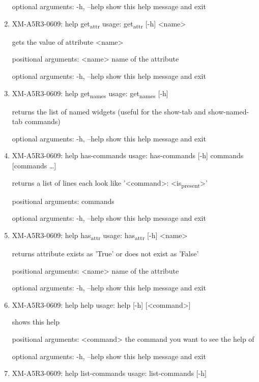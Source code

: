 \documentclass[11pt]{article}
\begin{document}
\begin{enumerate}
optional arguments:
  -h, --help  show this help message and exit

\item XM-A5R3-0609: help get\textsubscript{attr}
\label{sec:orgcdb95ce}
usage: get\textsubscript{attr} [-h] <name>

gets the value of attribute <name>

positional arguments:
  <name>      name of the attribute

optional arguments:
  -h, --help  show this help message and exit

\item XM-A5R3-0609: help get\textsubscript{names}
\label{sec:org6a14941}
usage: get\textsubscript{names} [-h]

returns the list of named widgets (useful for the show-tab and show-named-tab
commands)

optional arguments:
  -h, --help  show this help message and exit

\item XM-A5R3-0609: help has-commands
\label{sec:org27b76ad}
usage: has-commands [-h] commands [commands \ldots{}]

returns a list of lines each look like '<command>: <is\textsubscript{present}>'

positional arguments:
  commands

optional arguments:
  -h, --help  show this help message and exit

\item XM-A5R3-0609: help has\textsubscript{attr}
\label{sec:orgdf97d0d}
usage: has\textsubscript{attr} [-h] <name>

returns attribute exists as 'True' or does not exist as 'False'

positional arguments:
  <name>      name of the attribute

optional arguments:
  -h, --help  show this help message and exit

\item XM-A5R3-0609: help help
\label{sec:orgf63010d}
usage: help [-h] [<command>]

shows this help

positional arguments:
  <command>   the command you want to see the help of

optional arguments:
  -h, --help  show this help message and exit

\item XM-A5R3-0609: help list-commands
\label{sec:org4f63a31}
usage: list-commands [-h]


\end{enumerate}
\end{document}
